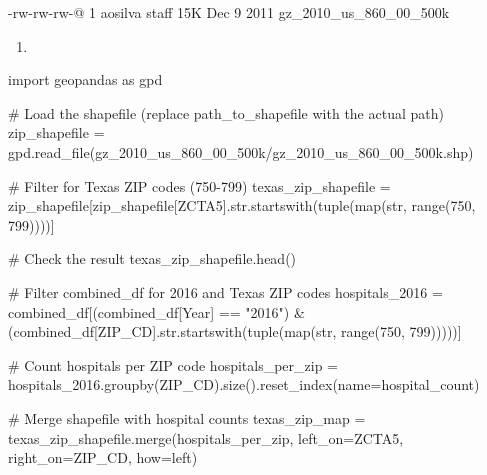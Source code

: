 \documentclass[
  letterpaper,
  DIV=11,
  numbers=noendperiod]{scrartcl}
\newenvironment{Shaded}{\begin{snugshade}}{\end{snugshade}}
\newcommand{\BuiltInTok}[1]{\textcolor[rgb]{0.00,0.23,0.31}{#1}}
\newcommand{\CommentTok}[1]{\textcolor[rgb]{0.37,0.37,0.37}{#1}}
\newcommand{\DecValTok}[1]{\textcolor[rgb]{0.68,0.00,0.00}{#1}}
\newcommand{\ImportTok}[1]{\textcolor[rgb]{0.00,0.46,0.62}{#1}}
\newcommand{\NormalTok}[1]{\textcolor[rgb]{0.00,0.23,0.31}{#1}}
\newcommand{\OperatorTok}[1]{\textcolor[rgb]{0.37,0.37,0.37}{#1}}
\newcommand{\StringTok}[1]{\textcolor[rgb]{0.13,0.47,0.30}{#1}}
\providecommand{\tightlist}{%
  \setlength{\itemsep}{0pt}\setlength{\parskip}{0pt}}\usepackage{longtable,booktabs,array}
\begin{document}
-rw-rw-rw-@ 1 aosilva staff 15K Dec 9 2011 gz\_2010\_us\_860\_00\_500k

\begin{enumerate}
\def\labelenumi{\arabic{enumi}.}
\setcounter{enumi}{1}
\tightlist
\item
\end{enumerate}

\begin{Shaded}
\begin{Highlighting}[]
\ImportTok{import}\NormalTok{ geopandas }\ImportTok{as}\NormalTok{ gpd}

\CommentTok{\# Load the shapefile (replace \textquotesingle{}path\_to\_shapefile\textquotesingle{} with the actual path)}
\NormalTok{zip\_shapefile }\OperatorTok{=}\NormalTok{ gpd.read\_file(}\StringTok{\textquotesingle{}gz\_2010\_us\_860\_00\_500k/gz\_2010\_us\_860\_00\_500k.shp\textquotesingle{}}\NormalTok{)}

\CommentTok{\# Filter for Texas ZIP codes (750{-}799)}
\NormalTok{texas\_zip\_shapefile }\OperatorTok{=}\NormalTok{ zip\_shapefile[zip\_shapefile[}\StringTok{\textquotesingle{}ZCTA5\textquotesingle{}}\NormalTok{].}\BuiltInTok{str}\NormalTok{.startswith(}\BuiltInTok{tuple}\NormalTok{(}\BuiltInTok{map}\NormalTok{(}\BuiltInTok{str}\NormalTok{, }\BuiltInTok{range}\NormalTok{(}\DecValTok{750}\NormalTok{, }\DecValTok{799}\NormalTok{))))]}

\CommentTok{\# Check the result}
\NormalTok{texas\_zip\_shapefile.head()}

\CommentTok{\# Filter combined\_df for 2016 and Texas ZIP codes}
\NormalTok{hospitals\_2016 }\OperatorTok{=}\NormalTok{ combined\_df[(combined\_df[}\StringTok{\textquotesingle{}Year\textquotesingle{}}\NormalTok{] }\OperatorTok{==} \StringTok{"2016"}\NormalTok{) }\OperatorTok{\&} 
\NormalTok{                             (combined\_df[}\StringTok{\textquotesingle{}ZIP\_CD\textquotesingle{}}\NormalTok{].}\BuiltInTok{str}\NormalTok{.startswith(}\BuiltInTok{tuple}\NormalTok{(}\BuiltInTok{map}\NormalTok{(}\BuiltInTok{str}\NormalTok{, }\BuiltInTok{range}\NormalTok{(}\DecValTok{750}\NormalTok{, }\DecValTok{799}\NormalTok{)))))]}

\CommentTok{\# Count hospitals per ZIP code}
\NormalTok{hospitals\_per\_zip }\OperatorTok{=}\NormalTok{ hospitals\_2016.groupby(}\StringTok{\textquotesingle{}ZIP\_CD\textquotesingle{}}\NormalTok{).size().reset\_index(name}\OperatorTok{=}\StringTok{\textquotesingle{}hospital\_count\textquotesingle{}}\NormalTok{)}

\CommentTok{\# Merge shapefile with hospital counts}
\NormalTok{texas\_zip\_map }\OperatorTok{=}\NormalTok{ texas\_zip\_shapefile.merge(hospitals\_per\_zip, left\_on}\OperatorTok{=}\StringTok{\textquotesingle{}ZCTA5\textquotesingle{}}\NormalTok{, right\_on}\OperatorTok{=}\StringTok{\textquotesingle{}ZIP\_CD\textquotesingle{}}\NormalTok{, how}\OperatorTok{=}\StringTok{\textquotesingle{}left\textquotesingle{}}\NormalTok{)}


\end{Highlighting}
\end{Shaded}
\end{document}
